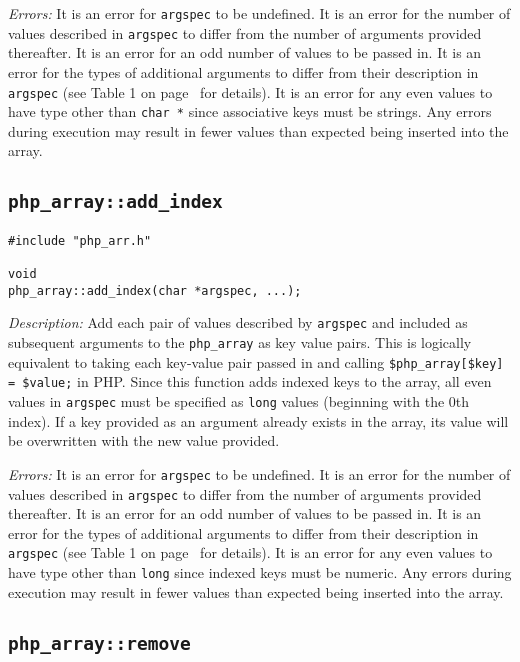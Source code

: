 \documentclass[11pt,titlepage]{article}
\begin{document}
\emph{Errors:} It is an error for \verb|argspec| to be undefined. It is an error for the number of values described in \verb|argspec| to differ from the number of arguments provided thereafter. It is an error for an odd number of values to be passed in. It is an error for the types of additional arguments to differ from their description in \verb|argspec| (see Table 1 on page~\pageref{Table1} for details). It is an error for any even values to have type other than \verb|char *| since associative keys must be strings. Any errors during execution may result in fewer values than expected being inserted into the array.


\subsection{\texttt{php\_array::add\_index}}

\begin{verbatim}
#include "php_arr.h"

void 
php_array::add_index(char *argspec, ...);
\end{verbatim}

\emph{Description:} Add each pair of values described by \verb|argspec| and included as subsequent arguments to the \verb|php_array| as key value pairs. This is logically equivalent to taking each key-value pair passed in and calling \verb|$php_array[$key] = $value;| in PHP. Since this function adds indexed keys to the array, all even values in \verb|argspec| must be specified as \verb|long| values (beginning with the 0th index). If a key provided as an argument already exists in the array, its value will be overwritten with the new value provided.

\emph{Errors:} It is an error for \verb|argspec| to be undefined. It is an error for the number of values described in \verb|argspec| to differ from the number of arguments provided thereafter. It is an error for an odd number of values to be passed in. It is an error for the types of additional arguments to differ from their description in \verb|argspec| (see Table 1 on page~\pageref{Table1} for details). It is an error for any even values to have type other than \verb|long| since indexed keys must be numeric. Any errors during execution may result in fewer values than expected being inserted into the array.


\subsection{\texttt{php\_array::remove}}
\end{document}
